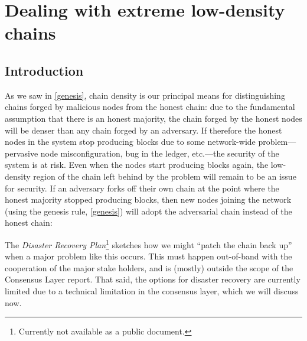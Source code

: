 \chapter{Dealing with extreme low-density chains}
\label{low-density}

\section{Introduction}

As we saw in \cref{genesis}, chain density is our principal means for
distinguishing chains forged by malicious nodes from the honest chain: due to
the fundamental assumption that there is an honest majority, the chain forged by
the honest nodes will be denser than any chain forged by an adversary. If
therefore the honest nodes in the system stop producing blocks due to some
network-wide problem---pervasive node misconfiguration, bug in the ledger,
etc.---the security of the system is at risk. Even when the nodes start
producing blocks again, the low-density region of the chain left behind by the
problem will remain to be an issue for security. If an adversary forks off
their own chain at the point where the honest majority stopped producing blocks,
then new nodes joining the network (using the genesis rule, \cref{genesis}) will
adopt the adversarial chain instead of the honest chain:
%
\begin{center}
\end{center}
%
The \emph{Disaster Recovery Plan}\footnote{Currently not available as a public
document.} sketches how we might ``patch the chain back up'' when a major
problem like this occurs. This must happen out-of-band with the cooperation of
the major stake holders, and is (mostly) outside the scope of the Consensus
Layer report. That said, the options for disaster recovery are currently limited
due to a technical limitation in the consensus layer, which we will discuss now.

